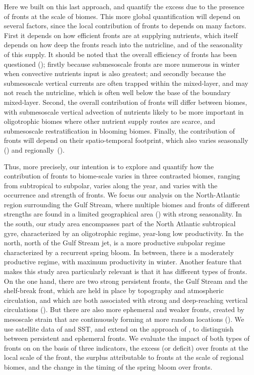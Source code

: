 Here we built on this last approach, and quantify the excess  due to the presence of fronts at the scale of biomes.
This more global quantification will depend on several factors, since the local contribution of fronts to  depends on many factors.
First it depends on how efficient fronts are at supplying nutrients, which itself depends on how deep the fronts reach into the nutricline, and of the seasonality of this supply.
It should be noted that the overall efficiency of fronts has been questioned (\cite{levy_2018}); firstly because submesoscale fronts are more numerous in winter when convective nutrients input is also greatest; and secondly because the submesoscale vertical currents are often trapped within the mixed-layer, and may not reach the nutricline, which is often well below the base of the boundary mixed-layer.
Second, the overall contribution of fronts will differ between biomes, with submesoscale vertical advection of nutrients likely to be more important in oligotrophic biomes where other nutrient supply routes are scarce, and submesoscale restratification in blooming biomes.
Finally, the contribution of fronts will depend on their spatio-temporal footprint, which also varies seasonally (\cite{callies_2015}) and regionally~(\cite{mauzole_2022}).

Thus, more precisely, our intention is to explore and quantify how the contribution of fronts to biome-scale  varies in three contrasted biomes, ranging from subtropical to subpolar, varies along the year, and varies with the occurrence and strength of fronts.
We focus our analysis on the North-Atlantic region surrounding the Gulf Stream, where multiple biomes and fronts of different strengths are found in a limited geographical area (\cite{bock_2022}) with strong seasonality.
In the south, our study area encompasses part of the North Atlantic subtropical gyre, characterized by an oligotrophic regime, year-long low productivity.
In the north, north of the Gulf Stream jet, is a more productive subpolar regime characterized by a recurrent spring bloom.
In between, there is a moderately productive regime, with maximum productivity in winter.
Another feature that makes this study area particularly relevant is that it has different types of fronts.
On the one hand, there are two strong persistent fronts, the Gulf Stream and the shelf-break front, which are held in place by topography and atmospheric circulation, and which are both associated with strong and deep-reaching vertical circulations (\cite{flagg_2006, liao_2022}).
But there are also more ephemeral and weaker fronts, created by mesoscale strain that are continuously forming at more random locations (\cite{drushka_2019, sanchez-rios_2020}).
We use satellite data of  and SST, and extend on the approach of \textcite{liu_2016}, to distinguish between persistent and ephemeral fronts.
We evaluate the impact of both types of fronts on  on the basis of three indicators, the excess (or deficit)  over fronts at the local scale of the front, the surplus  attributable to fronts at the scale of regional biomes, and the change in the timing of the  spring bloom over fronts.


